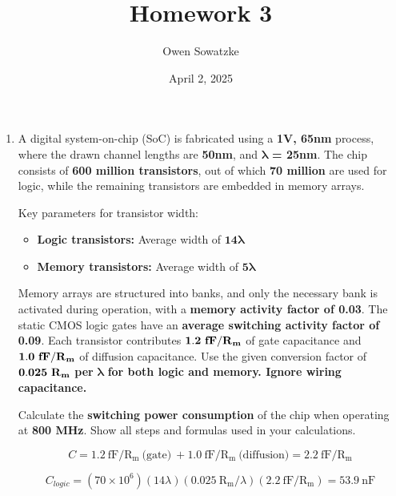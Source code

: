 \documentclass[fleqn]{article}
\title{Homework 3}
\author{Owen Sowatzke}
\date{April 2, 2025}
\newcommand{\zerodisplayskip}{
	\setlength{\abovedisplayskip}{0pt}%
	\setlength{\belowdisplayskip}{0pt}%
	\setlength{\abovedisplayshortskip}{0pt}%
	\setlength{\belowdisplayshortskip}{0pt}%
	\setlength{\mathindent}{0pt}}
\begin{document}
	\offinterlineskip
	\setlength{\lineskip}{12pt}
	\zerodisplayskip
	\maketitle
	
	\begin{enumerate}
		\item A digital system-on-chip (SoC) is fabricated using a \textbf{1V, 65nm} process, where the drawn channel lengths are \textbf{50nm}, and $\mathbf{\lambda}$ \textbf{= 25nm}. The chip consists of \textbf{600 million transistors}, out of which \textbf{70 million} are used for logic, while the remaining transistors are embedded in memory arrays. 
		
		Key parameters for transistor width: 

		\begin{itemize}
			\item \textbf{Logic transistors:} Average width of $\mathbf{14\lambda}$	 
			\item \textbf{Memory transistors:} Average width of $\mathbf{5\lambda}$
		\end{itemize}
			 
		Memory arrays are structured into banks, and only the necessary bank is activated during operation, with a \textbf{memory activity factor of 0.03}. The static CMOS logic gates have an \textbf{average switching activity factor of 0.09}. Each transistor contributes $\mathbf{1.2\ \text{\textbf{fF}}/\text{\textbf{R}}_\text{\textbf{m}}}$ of gate capacitance and $\mathbf{1.0\ \text{\textbf{fF}}/\text{\textbf{R}}_\text{\textbf{m}}}$ of diffusion capacitance. Use the given conversion factor of $\mathbf{0.025\ \text{\textbf{R}}_\text{\textbf{m}}}$ \textbf{per} $\mathbf{\lambda}$ \textbf{for both logic and memory. Ignore wiring capacitance.}
		
		Calculate the \textbf{switching power consumption} of the chip when operating at \textbf{800 MHz}. Show all steps and formulas used in your calculations.
		
		\begin{equation*}
			C = 1.2\ \text{fF}/\text{R}_\text{m}\ \text{(gate)}\ + 1.0\ \text{fF}/\text{R}_\text{m}\ \text{(diffusion)} = 2.2\ \text{fF}/\text{R}_\text{m}
		\end{equation*}
		
		\begin{equation*}
			C_{logic} = (70 \times 10^6)(14\lambda)(0.025\ \text{R}_\text{m}/\lambda)(2.2\ \text{fF}/\text{R}_\text{m}) = 53.9\ \text{nF}
		\end{equation*}
		

\end{enumerate}
\end{document}
